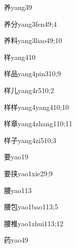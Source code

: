 \begin{verbete}{养}{yang3}{9}
\end{verbete}
\begin{verbete}{养分}{yang3fen4}{9;4}
\end{verbete}
\begin{verbete}{养料}{yang3liao4}{9;10}
\end{verbete}
\begin{verbete}{样}{yang4}{10}
\end{verbete}
\begin{verbete}{样品}{yang4pin3}{10;9}
\end{verbete}
\begin{verbete}{样儿}{yang4r5}{10;2}
\end{verbete}
\begin{verbete}{样样}{yang4yang4}{10;10}
\end{verbete}
\begin{verbete}{样章}{yang4zhang1}{10;11}
\end{verbete}
\begin{verbete}{样子}{yang4zi5}{10;3}
\end{verbete}
\begin{verbete}{要}{yao1}{9}
\end{verbete}
\begin{verbete}{要挟}{yao1xie2}{9;9}
\end{verbete}
\begin{verbete}{腰}{yao1}{13}
\end{verbete}
\begin{verbete}{腰包}{yao1bao1}{13;5}
\end{verbete}
\begin{verbete}{腰椎}{yao1zhui1}{13;12}
\end{verbete}
\begin{verbete}{药}{yao4}{9}
\end{verbete}
